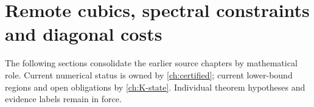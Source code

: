 \chapter{Remote cubics, spectral constraints and diagonal costs}\label{ch:07-remote-spectral}
\noindent The following sections consolidate the earlier source chapters by mathematical role. Current numerical status is owned by \autoref{ch:certified}; current lower-bound regions and open obligations by \autoref{ch:K-state}. Individual theorem hypotheses and evidence labels remain in force.










